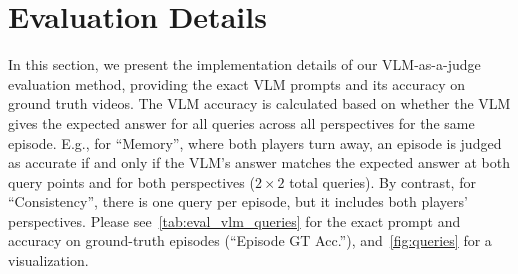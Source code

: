 \section{Evaluation Details}
\label{sec:appendix_eval}
In this section, we present the implementation details of our VLM-as-a-judge evaluation method, providing the exact VLM prompts and its accuracy on ground truth videos.  The VLM accuracy is calculated based on whether the VLM gives the expected answer for all queries across all perspectives for the same episode. E.g., for ``Memory'', where both players turn away, an episode is judged as accurate if and only if the VLM's answer matches the expected answer at both query points and for both perspectives ($2 \times 2$ total queries). By contrast, for ``Consistency'', there is one query per episode, but it includes both players' perspectives. Please see~\cref{tab:eval_vlm_queries} for the exact prompt and accuracy on ground-truth episodes (“Episode GT Acc.”), and~\cref{fig:queries} for a visualization.

